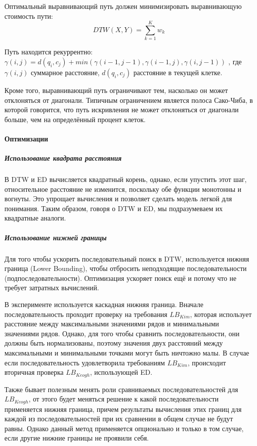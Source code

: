 \documentclass[12pt,twoside]{article}
\begin{document}
        Оптимальный выравнивающий путь должен минимизировать выравнивающую стоимость пути:
            $$
                DTW(X, Y)=\displaystyle\sum\limits_{k=1}^{K} w_k
            $$
            
        Путь находится рекуррентно:\\
            $\gamma(i, j) = d(q_i, c_j) + min({\gamma(i-1, j-1), \gamma(i-1, j), \gamma(i, j-1)})$ ,
            где $\gamma(i, j)$ суммарное расстояние, $d(q_i, c_j)$ расстояние в текущей клетке.
						
				Кроме того, выравнивающий путь ограничивают тем, насколько он может отклоняться от диагонали. Типичным ограничением является полоса Сако-Чиба, в которой говорится, что путь искривления не может отклоняться от диагонали больше, чем на определённый процент клеток.
						
				\paragraph{Оптимизации}
				
				\subparagraph{Использование квадрата расстояния}	
				В DTW и ED вычисляется квадратный корень, однако, если упустить этот шаг, относительное расстояние не изменится, поскольку обе функции монотонны и вогнуты. Это упрощает вычисления и позволяет сделать модель легкой для понимания. Таким образом, говоря о DTW и ED, мы подразумеваем их квадратные аналоги.
				
			  \subparagraph{Использование нижней границы}
				Для того чтобы ускорить последовательный поиск в DTW, используется нижняя граница (Lower Bounding), чтобы отбросить неподходящие последовательности (подпоследовательности). Оптимизация ускоряет поиск ещё и потому что не требует затратных вычислений.
				
				В эксперименте используется каскадная нижняя граница. Вначале последовательность проходит проверку на требования $LB_{Kim}$, которая использует расстояние между максимальными значениями рядов и минимальными значениями рядов. Однако, для того чтобы сравнить последовательности, они должны быть нормализованы, поэтому значения двух расстояний между максимальными и минимальными точками могут быть ничтожно малы. В случае если последовательность удовлетворила требованиям $LB_{Kim}$, происходит вторичная проверка $LB_{Keogh}$, использующей ED.
				
				Также бывает полезным менять роли сравниваемых последовательностей для $LB_{Keogh}$, от этого будет меняться решение к какой последовательности применяется нижняя граница, причем результаты вычисления этих границ для каждой из последовательностей при их сравнении в общем случае не будут равны. Однако данный метод применяется опционально и только в том случае, если другие нижние границы не проявили себя.
				
\end{document}
